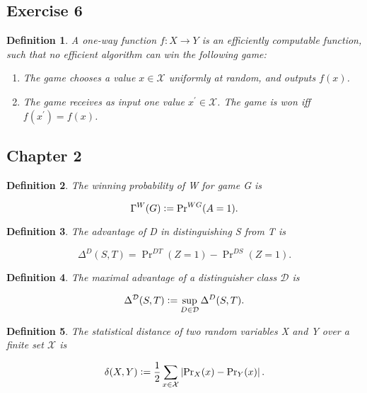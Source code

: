 \documentclass[a4paper,german]{article}
\newtheorem{definition}{Definition}
\begin{document}
\subsection*{Exercise 6}
\begin{definition}
	A one-way function $f: X \rightarrow Y$ is an efficiently computable function, such that no efficient algorithm can win the following game:

	\begin{enumerate}
	
		\item  The game chooses a value $x \in \mathcal{X}$ uniformly at random, and outputs $f(x)$.
		\item  The game receives as input one value $x^\prime \in \mathcal{X}$. The game is won iff $f(x^\prime) = f(x)$.
	
	\end{enumerate}
\end{definition}
\subsection*{Chapter 2}

\begin{definition}
	The winning probability of \emph{W} for game \emph{G} is

	\[
		\Gamma^{W}(G) \vcentcolon= \Pr\nolimits^{WG}(A = 1)
	.\] 

\end{definition}

\begin{definition}
	The advantage of \emph{D} in distinguishing \emph{S} from \emph{T} is

	\[
		\Delta^D(S,T) = \Pr\nolimits^{DT} (Z = 1) - \Pr\nolimits^{DS}(Z = 1)
	.\] 
\end{definition}

\begin{definition}
	The maximal advantage of a distinguisher class $\mathcal{D}$ is

	\[
		\Delta^\mathcal{D}(S,T) \vcentcolon= \sup_{D \in \mathcal{D}}\Delta^D(S,T)
	.\] 
\end{definition}

\begin{definition}
	The statistical distance of two random variables \emph{X} and \emph{Y} over a finite set $\mathcal{X}$ is

	\[
		\delta(X,Y) \vcentcolon= \frac{1}{2} \sum\limits_{x \in \mathcal{X}} \left| \Pr\nolimits_X(x) - \Pr\nolimits_Y(x)\right|
	.\] 
\end{definition}
\end{document}
